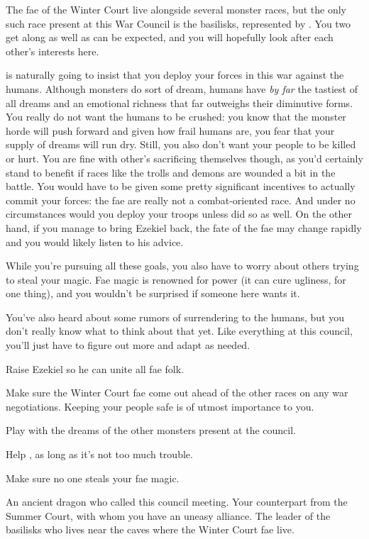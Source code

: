 \documentclass[char]{guildcamp2}
\begin{document}
The fae of the Winter Court live alongside several monster races, but the only such race present at this War Council is the basilisks, represented by \cBasilisk{\intro}. You two get along as well as can be expected, and you will hopefully look after each other's interests here.

\cOnyx{} is naturally going to insist that you deploy your forces in this war against the humans. Although monsters do sort of dream, humans have \emph{by far} the tastiest of all dreams and an emotional richness that far outweighs their diminutive forms. You really do not want the humans to be crushed: you know that the monster horde will push forward and given how frail humans are, you fear that your supply of dreams will run dry. Still, you also don't want your people to be killed or hurt. You are fine with other's sacrificing themselves though, as you'd certainly stand to benefit if races like the trolls and demons are wounded a bit in the battle. You would have to be given some pretty significant incentives to actually commit your forces: the fae are really not a combat-oriented race. And under no circumstances would you deploy your troops unless \cTreeFae{} did so as well. On the other hand, if you manage to bring Ezekiel back, the fate of the fae may change rapidly and you would likely listen to his advice.

While you're pursuing all these goals, you also have to worry about others trying to steal your magic.  Fae magic is renowned for power (it can cure ugliness, for one thing), and you wouldn't be surprised if someone here wants it.

You've also heard about some rumors of surrendering to the humans, but you don't really know what to think about that yet. Like everything at this council, you'll just have to figure out more and adapt as needed. 

\begin{itemz}[Goals]
  \item Raise Ezekiel so he can unite all fae folk.
  \item Make sure the Winter Court fae come out ahead of the other races on any war negotiations. Keeping your people safe is of utmost importance to you.
  \item Play with the dreams of the other monsters present at the council.
  \item Help \cBasilisk{}, as long as it's not too much trouble.
  \item Make sure no one steals your fae magic.
\end{itemz}


\begin{contacts}
  \contact{\cOnyx{}} An ancient dragon who called this council meeting.
  \contact{\cTreeFae{}} Your counterpart from the Summer Court, with whom you have an uneasy alliance.
  \contact{\cBasilisk{}} The leader of the basilisks who lives near the caves where the Winter Court fae live.
\end{contacts}
\end{document}
